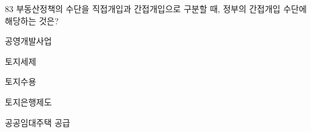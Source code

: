 \begin{question}{83}
부동산정책의 수단을 직접개입과 간접개입으로 구분할 때, 정부의 간접개입 수단에 해당하는 것은?
\begin{choices}
  \item 공영개발사업
  \item 토지세제
  \item 토지수용
  \item 토지은행제도
  \item 공공임대주택 공급
\end{choices}
\end{question}
